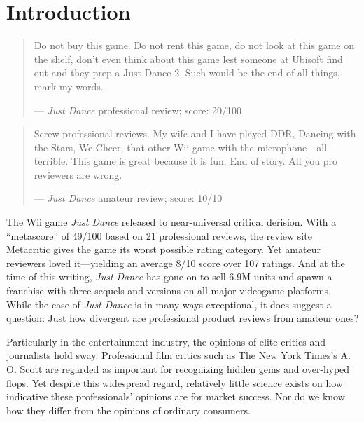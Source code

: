 \documentclass{sig-alternate}
\begin{document}
\section{Introduction}
\begin{quote}
\small
Do not buy this game. Do not rent this game, do not look at this game on the shelf, don't even think about this game lest someone at Ubisoft find out and they prep a Just Dance 2. Such would be the end of all things, mark my words.

--- \textit{Just Dance} professional review; score: 20/100 %
\end{quote}

\begin{quote}
\small
Screw professional reviews. My wife and I have played DDR, Dancing with
the Stars, We Cheer, that other Wii game with the microphone---all terrible. This game is great because it is fun. End of story. All you pro reviewers are wrong.

--- \textit{Just Dance} amateur review; score: 10/10
\end{quote}

The Wii game \textit{Just Dance} released to near-universal
critical derision. With a ``metascore'' of 49/100 based on 21
professional reviews, the review site Metacritic gives the game its worst
possible rating category. Yet amateur reviewers loved it---yielding an average 8/10 score over 107 ratings. And at the
time of this writing, \textit{Just Dance} has gone on to sell 6.9M units
and spawn a franchise with three sequels and versions on all major
videogame platforms. While the case of \textit{Just Dance} is in many
ways exceptional, it does suggest a question: Just how divergent are professional product reviews from amateur ones?

Particularly in the entertainment industry, the opinions of elite
critics and journalists hold sway. Professional film critics
such as The New York Times's A. O. Scott are regarded as important
for recognizing hidden gems and over-hyped flops. Yet despite this
widespread regard, relatively little science exists on how indicative
these professionals' opinions are for market success. Nor do we know 
how they differ from the opinions of ordinary consumers.
\end{document}
